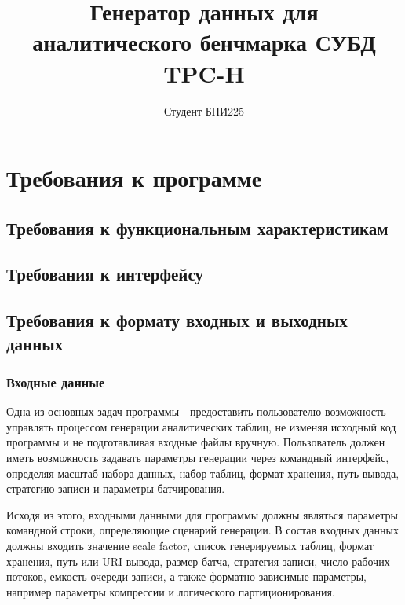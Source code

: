 \documentclass{../TechDoc}
\title{Генератор данных для аналитического бенчмарка СУБД TPC-H}
\author{Студент БПИ225}{Дергоусов М.А}
\begin{document}
    \maketitle
    
    \tableofcontents
    
    
    
    

    \section{Требования к программе}
    
    \subsection{Требования к функциональным характеристикам}
    
    
        
    \subsection{Требования к интерфейсу}
        
    
 
    \subsection{Требования к формату входных и выходных данных}
    
    \subsubsection{Входные данные}

    Одна из основных задач программы - предоставить пользователю возможность управлять процессом генерации аналитических таблиц, не изменяя исходный код программы и не подготавливая входные файлы вручную. Пользователь должен иметь возможность задавать параметры генерации через командный интерфейс, определяя масштаб набора данных, набор таблиц, формат хранения, путь вывода, стратегию записи и параметры батчирования.
    
    Исходя из этого, входными данными для программы должны являться параметры командной строки, определяющие сценарий генерации. В состав входных данных должны входить значение scale factor, список генерируемых таблиц, формат хранения, путь или URI вывода, размер батча, стратегия записи, число рабочих потоков, емкость очереди записи, а также форматно-зависимые параметры, например параметры компрессии и логического партиционирования.
\end{document}
